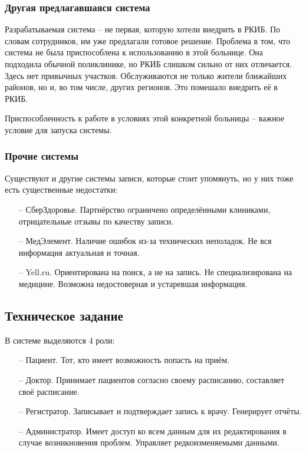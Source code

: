 \documentclass[a4paper,article]{article}
\begin{document}
\begin{sloppypar}
    \newpage

    \subsubsection{Другая предлагавшаяся система}

        Разрабатываемая система -- не первая, которую хотели внедрить в РКИБ. По словам сотрудников, им уже предлагали готовое решение. Проблема в том, что система не была приспособлена к использованию в этой больнице. Она подходила обычной поликлинике, но РКИБ слишком сильно от них отличается. Здесь нет привычных участков. Обслуживаются не только жители ближайших районов, но и, во том числе, других регионов. Это помешало внедрить её в РКИБ.

        Приспособленность к работе в условиях этой конкретной больницы -- важное условие для запуска системы.
        
    \subsubsection{Прочие системы}
    
        Существуют и другие системы записи, которые стоит упомянуть, но у них тоже есть существенные недостатки:
        
        \begin{itemize}[nolistsep]
            \item[--] СберЗдоровье. Партнёрство ограничено определёнными клиниками, отрицательные отзывы по качеству записи.
            \item[--] МедЭлемент. Наличие ошибок из-за технических неполадок. Не вся информация актуальная и точная.
            \item[--] Yell.ru. Ориентирована на поиск, а не на запись. Не специализирована на медицине. Возможна недостоверная и устаревшая информация.
        \end{itemize}

    \subsection{Техническое задание}\label{Техническое задание}

        В системе выделяются 4 роли:

        \begin{itemize}[nolistsep]
            \item[--] Пациент. Тот, кто имеет возможность попасть на приём.
            \item[--] Доктор. Принимает пациентов согласно своему расписанию, составляет своё расписание.
            \item[--] Регистратор. Записывает и подтверждает запись к врачу. Генерирует отчёты.
            \item[--] Администратор. Имеет доступ ко всем данным для их редактирования в случае возникновения проблем. Управляет редкоизменяемыми данными.
        \end{itemize}


\end{sloppypar}
\end{document}
